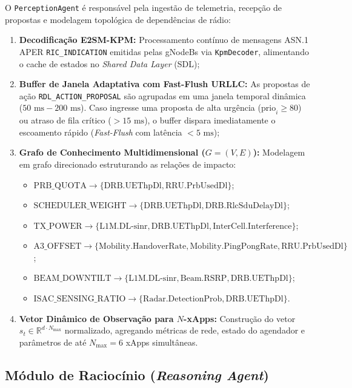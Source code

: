 \documentclass[12pt]{article}
\begin{document}
O \texttt{PerceptionAgent} é responsável pela ingestão de telemetria, recepção de propostas e modelagem topológica de dependências de rádio:
\begin{enumerate}
    \item \textbf{Decodificação E2SM-KPM:} Processamento contínuo de mensagens ASN.1 APER \texttt{RIC\_INDICATION} emitidas pelas gNodeBs via \texttt{KpmDecoder}, alimentando o cache de estados no \textit{Shared Data Layer} (SDL);
    \item \textbf{Buffer de Janela Adaptativa com Fast-Flush URLLC:} As propostas de ação \texttt{RDL\_ACTION\_PROPOSAL} são agrupadas em uma janela temporal dinâmica ($50\text{ ms} - 200\text{ ms}$). Caso ingresse uma proposta de alta urgência ($\text{prio}_i \ge 80$) ou atraso de fila crítico ($> 15\text{ ms}$), o buffer dispara imediatamente o escoamento rápido (\textit{Fast-Flush} com latência $< 5\text{ ms}$);
    \item \textbf{Grafo de Conhecimento Multidimensional ($G = (V, E)$):} Modelagem em grafo direcionado estruturando as relações de impacto:
    \begin{itemize}
        \item $\text{PRB\_QUOTA} \longrightarrow \{\text{DRB.UEThpDl}, \text{RRU.PrbUsedDl}\}$;
        \item $\text{SCHEDULER\_WEIGHT} \longrightarrow \{\text{DRB.UEThpDl}, \text{DRB.RlcSduDelayDl}\}$;
        \item $\text{TX\_POWER} \longrightarrow \{\text{L1M.DL-sinr}, \text{DRB.UEThpDl}, \text{InterCell.Interference}\}$;
        \item $\text{A3\_OFFSET} \longrightarrow \{\text{Mobility.HandoverRate}, \text{Mobility.PingPongRate}, \text{RRU.PrbUsedDl}\}$;
        \item $\text{BEAM\_DOWNTILT} \longrightarrow \{\text{L1M.DL-sinr}, \text{Beam.RSRP}, \text{DRB.UEThpDl}\}$;
        \item $\text{ISAC\_SENSING\_RATIO} \longrightarrow \{\text{Radar.DetectionProb}, \text{DRB.UEThpDl}\}$.
    \end{itemize}
    \item \textbf{Vetor Dinâmico de Observação para $N$-xApps:} Construção do vetor $s_t \in \mathbb{R}^{d \cdot N_{\max}}$ normalizado, agregando métricas de rede, estado do agendador e parâmetros de até $N_{\max} = 6$ xApps simultâneas.
\end{enumerate}

\subsection{Módulo de Raciocínio (\textit{Reasoning Agent})}
\end{document}

